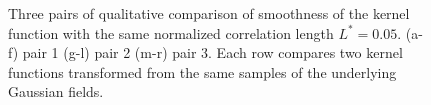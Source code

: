 \begin{figure}[!htb]
\begin{subfigure}[b]{0.15\textwidth}
    \caption{}
    \label{fig: Chapter4/2D/d_exp_cartesian_5_5_rho_0_seed_e}
  \end{subfigure}
  \caption[Three pairs of qualitative comparison of smoothness of the kernel function with the same normalized  correlation length.]{ Three pairs of qualitative comparison of smoothness of the kernel function with the same normalized  correlation length $L^* = 0.05$. (a-f) pair 1 (g-l) pair 2 (m-r) pair 3. Each row compares two kernel functions transformed from the same samples of the underlying Gaussian fields. }
  \label{fig: Chapter4/2D/compare_smoothness}
\end{figure}
